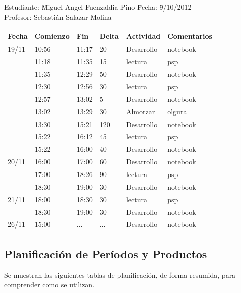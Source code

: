 \documentclass[a4paper,12pt,openany,oneside]{book}
\begin{document}
\begin{tabbing}
Estudiante: \= Miguel Angel Fuenzaldia Pino \= Fecha: \= 9/10/2012\\
Profesor: \> Sebastián Salazar Molina \>   \>  \\
\end{tabbing}
\begin{tabular}{| l | l | l | l | l | l | l | l | l |}
\hline
\textbf{Fecha} & \textbf{Comienzo} & \textbf{Fin} & \textbf{Delta} & \textbf{Actividad} & \textbf{Comentarios}\\
\hline
19/11 & 10:56 & 11:17 & 20 & Desarrollo & notebook\\
\hline
      & 11:18 & 11:35 & 15 & lectura & psp\\
\hline
      & 11:35 & 12:29 & 50 & Desarrollo & notebook\\
\hline
      & 12:30 & 12:56 & 30 & lectura & psp\\
\hline
      & 12:57 & 13:02 & 5 & Desarrollo & notebook\\
\hline
      & 13:02 & 13:29 & 30 & Almorzar & olgura\\
\hline
      & 13:30 & 15:21 & 120 & Desarrollo & notebook\\
\hline
      & 15:22 & 16:12 & 45 & lectura & psp\\
\hline
      & 15:22 & 16:00 & 40 & Desarrollo & notebook\\
\hline   
20/11 & 16:00 & 17:00 & 60 & Desarrollo & notebook\\
\hline
      & 17:00 & 18:26 & 90 & lectura & psp\\
\hline
      & 18:30 & 19:00 & 30 & Desarrollo & notebook\\
\hline 
21/11 & 18:00 & 18:30 & 30 & lectura & psp\\
\hline
      & 18:30 & 19:00 & 30 & Desarrollo & notebook\\
\hline 
26/11 & 15:00 & ... & ... & Desarrollo & notebook\\
\hline
\end{tabular}
\subsection{Planificación de Períodos y Productos}
Se muestran las siguientes tablas de planificación, de forma resumida, para comprender como se utilizan.
\end{document}
